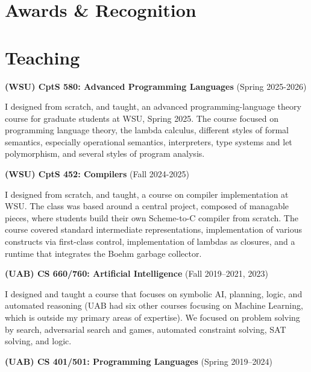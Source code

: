 \documentclass[line]{res}
\begin{document}
\begin{resume}
   
\section{\large Awards \& Recognition} \vspace{0.2in}

    
\section{\large Teaching} \vspace{0.2in}
    
\textbf{(WSU) CptS 580: Advanced Programming Languages} (Spring 2025-2026)

I designed from scratch, and taught, an advanced programming-language theory course for graduate students at WSU, Spring 2025. The course focused on programming language theory, the lambda calculus, different styles of formal semantics, especially operational semantics, interpreters, type systems and let polymorphism, and several styles of program analysis.
    
\textbf{(WSU) CptS 452: Compilers} (Fall 2024-2025)

I designed from scratch, and taught, a course on compiler implementation at WSU. The class was based around a central project, composed of managable pieces, where students build their own Scheme-to-C compiler from scratch. The course covered standard intermediate representations, implementation of various constructs via first-class control, implementation of lambdas as closures, and a runtime that integrates the Boehm garbage collector. 

\textbf{(UAB) CS 660/760: Artificial Intelligence} (Fall 2019--2021, 2023)

I designed and taught a course that focuses on symbolic AI, planning, logic, and automated reasoning (UAB had six other courses focusing on Machine Learning, which is outside my primary areas of expertise). We focused on problem solving by search, adversarial search and games, automated constraint solving, SAT solving, and logic. %

\textbf{(UAB) CS 401/501: Programming Languages} (Spring 2019--2024)


\end{resume}
\end{document}
